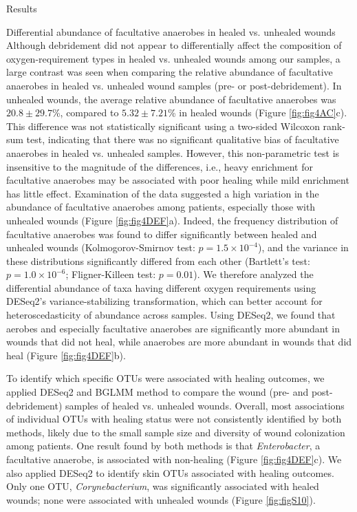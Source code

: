 \documentclass[oneside,12pt,final]{sty/ucthesis-CA2012}
\begin{document}
\begin{mainmatter}
\begin{section}{Results}
\begin{subsection}{Differential abundance of facultative anaerobes in healed vs. unhealed wounds}
Although debridement did not appear to differentially affect the composition of oxygen-requirement types in healed vs. unhealed wounds among our samples, a large contrast was seen when comparing the relative abundance of facultative anaerobes in healed vs. unhealed wound samples (pre- or post-debridement). In unhealed wounds, the average relative abundance of facultative anaerobes was $20.8\pm29.7$\%, compared to $5.32\pm7.21$\% in healed wounds (Figure \ref{fig:fig4AC}c). This difference was not statistically significant using a two-sided Wilcoxon rank-sum test, indicating that there was no significant qualitative bias of facultative anaerobes in healed vs. unhealed samples. However, this non-parametric test is insensitive to the magnitude of the differences, i.e., heavy enrichment for facultative anaerobes may be associated with poor healing while mild enrichment has little effect. Examination of the data suggested a high variation in the abundance of facultative anaerobes among patients, especially those with unhealed wounds (Figure \ref{fig:fig4DEF}a). Indeed, the frequency distribution of facultative anaerobes was found to differ significantly between healed and unhealed wounds (Kolmogorov-Smirnov test: $p = 1.5 \times 10^{-4}$), and the variance in these distributions significantly differed from each other (Bartlett’s test: $p = 1.0 \times 10^{-6}$; Fligner-Killeen test: $p = 0.01$). We therefore analyzed the differential abundance of taxa having different oxygen requirements using DESeq2’s variance-stabilizing transformation, which can better account for heteroscedasticity of abundance across samples. Using DESeq2, we found that aerobes and especially facultative anaerobes are significantly more abundant in wounds that did not heal, while anaerobes are more abundant in wounds that did heal (Figure \ref{fig:fig4DEF}b).

To identify which specific OTUs were associated with healing outcomes, we applied DESeq2 and BGLMM method to compare the wound (pre- and post-debridement) samples of healed vs. unhealed wounds. Overall, most associations of individual OTUs with healing status were not consistently identified by both methods, likely due to the small sample size and diversity of wound colonization among patients. One result found by both methods is that \textit{Enterobacter}, a facultative anaerobe, is associated with non-healing (Figure \ref{fig:fig4DEF}c). We also applied DESeq2 to identify skin OTUs associated with healing outcomes. Only one OTU, \textit{Corynebacterium}, was significantly associated with healed wounds; none were associated with unhealed wounds (Figure \ref{fig:figS10}). 


\end{subsection}
\end{section}
\end{mainmatter}
\end{document}

